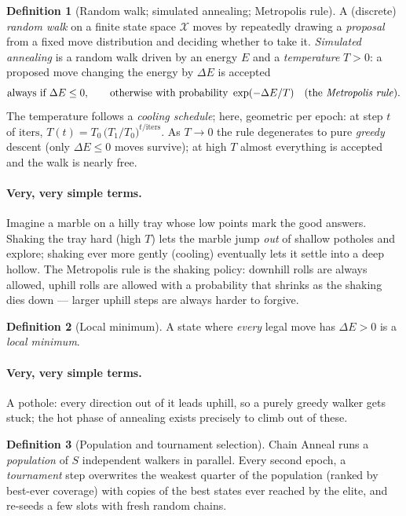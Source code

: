 \documentclass[11pt]{article}
\theoremstyle{definition}
\newtheorem{definition}{Definition}
\begin{document}
\begin{definition}[Random walk; simulated annealing; Metropolis rule]
\label{def:sa}
A (discrete) \emph{random walk} on a finite state space $\mathcal{X}$ moves
by repeatedly drawing a \emph{proposal} from a fixed move distribution and
deciding whether to take it. \emph{Simulated annealing} is a random walk
driven by an energy $E$ and a \emph{temperature} $T > 0$: a proposed move
changing the energy by $\Delta E$ is accepted
\[
\text{always if } \Delta E \leq 0,
\qquad
\text{otherwise with probability } \exp(-\Delta E / T)
\quad\text{(the \emph{Metropolis rule}).}
\]
The temperature follows a \emph{cooling schedule}; here, geometric per
epoch: at step $t$ of $\mathrm{iters}$,
$T(t) = T_0\,\bigl(T_1 / T_0\bigr)^{t/\mathrm{iters}}$.
As $T \to 0$ the rule degenerates to pure \emph{greedy} descent (only
$\Delta E \leq 0$ moves survive); at high $T$ almost everything is accepted
and the walk is nearly free.
\end{definition}

\paragraph{Very, very simple terms.}
Imagine a marble on a hilly tray whose low points mark the good answers.
Shaking the tray hard (high $T$) lets the marble jump \emph{out} of shallow
potholes and explore; shaking ever more gently (cooling) eventually lets it
settle into a deep hollow. The Metropolis rule is the shaking policy: downhill
rolls are always allowed, uphill rolls are allowed with a probability that
shrinks as the shaking dies down --- larger uphill steps are always harder to
forgive.

\begin{definition}[Local minimum]
A state where \emph{every} legal move has $\Delta E > 0$ is a
\emph{local minimum}.
\end{definition}

\paragraph{Very, very simple terms.}
A pothole: every direction out of it leads uphill, so a purely greedy walker
gets stuck; the hot phase of annealing exists precisely to climb out of
these.

\begin{definition}[Population and tournament selection]
\label{def:pop}
Chain Anneal runs a \emph{population} of $S$ independent walkers in
parallel. Every second epoch, a \emph{tournament} step overwrites the
weakest quarter of the population (ranked by best-ever coverage) with copies
of the best states ever reached by the elite, and re-seeds a few slots with
fresh random chains.
\end{definition}
\end{document}
